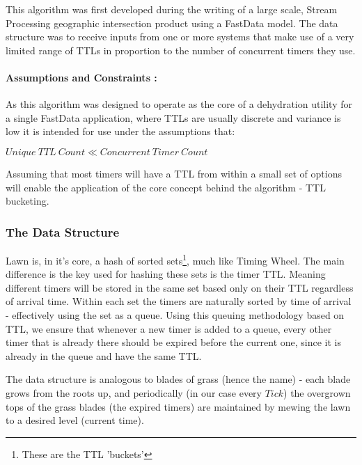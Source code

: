\documentclass[twocolumn,a4paper]{article}
\begin{document}
This algorithm was first developed during the writing of a large scale, Stream Processing geographic intersection product using a FastData\cite{GP} model. The data structure was to receive inputs from one or more systems that make use of a very limited range of TTLs in proportion to the number of concurrent timers they use. 

\paragraph{Assumptions and Constraints :}
As this algorithm was designed to operate as the core of a dehydration utility for a single  FastData application, where TTLs are usually discrete and variance is low it is intended for use under the assumptions that: 
\begin{center}
	$ Unique\ TTL\ Count \ll Concurrent\ Timer\ Count $
\end{center}
Assuming that most timers will have a TTL from within a small set of options will enable the application of the core concept behind the algorithm - TTL bucketing. 

\subsubsection{The Data Structure}
Lawn is, in it's core, a hash of sorted sets\footnote{These are the TTL 'buckets'}, much like Timing Wheel. The main difference is the key used for hashing these sets is the timer TTL. Meaning different timers will be stored in the same set based only on their TTL regardless of arrival time. Within each set the timers are naturally sorted by time  of arrival - effectively using the set as a queue. Using this queuing methodology based on TTL, we ensure that whenever a new timer is added to a queue, every other timer that is already there should be expired before the current one, since it is already in the queue and have the same TTL.

The data structure is analogous to blades of grass (hence the name) - each blade grows from the roots up, and periodically (in our case every $Tick$) the overgrown tops of the grass blades (the expired timers) are maintained by mewing the lawn to a desired level (current time).       
 
\end{document}
